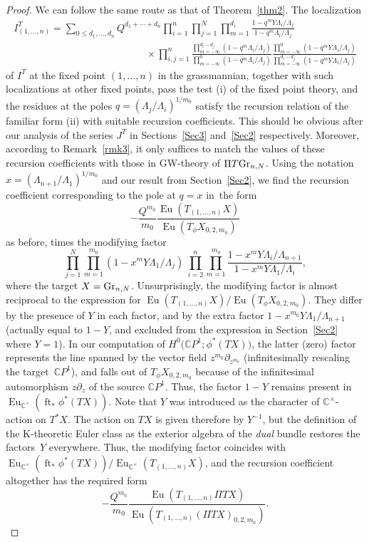 \documentclass[10pt,a4paper]{amsart}
\numberwithin{equation}{section}
\def\CC{\mathbb C}
\def\p{\partial}
\def\ft{\operatorname{ft}}
\def\Eu{\operatorname{Eu}}
\theoremstyle{definition}
\theoremstyle{plain}
\begin{document}
\begin{proof}
We can follow the same route as that of Theorem~\ref{thm2}. The localization
\begin{gather*}
I^T_{(1,\dots,n)}= \sum_{0\leq d_1,\dots,d_n}Q^{d_1+\cdots+d_n} \prod_{i=1}^n\prod_{j=1}^N\prod_{m=1}^{d_i}\frac{1-q^mY\Lambda_i/\Lambda_j} {1-q^m\Lambda_i/\Lambda_j} \\ \phantom{I^T_{(1,\dots,n)}= \sum_{0\leq d_1,\dots,d_n}Q^{d_1+\cdots}}
{}\times \prod_{i,j=1}^n\frac{\prod_{m=-\infty}^{d_i-d_j}(1-q^m\Lambda_i/\Lambda_j)} {\prod_{m=-\infty}^0(1-q^m\Lambda_i/\Lambda_j)}\frac{\prod_{m=-\infty}^0(1-q^mY \Lambda_i/\Lambda_j)} {\prod_{m=-\infty}^{d_i-d_j}(1-q^mY \Lambda_i/\Lambda_j)}
\end{gather*}
of $I^T$ at the fixed point $(1,\dots,n)$ in the grassmannian, together with such localizations at other fixed points, pass the test (i) of the fixed point theory, and the residues at the poles $q=(\Lambda_j/\Lambda_i)^{1/m_0}$ satisfy the recursion relation of the familiar form (ii) with suitable recursion coefficients. This should be obvious after our analysis of the series $J^T$ in Sections~\ref{Sec3} and~\ref{Sec2} respectively. Moreover, according to Remark~\ref{rmk3}, it only suffices to match the values of these recursion coefficients with those in GW-theory of $\Pi T {\rm Gr}_{n,N}$. Using the notation $x=(\Lambda_{n+1}/\Lambda_1)^{1/m_0}$ and our result from Section~\ref{Sec2}, we find the recursion coefficient corresponding to the pole at $q=x$ in~the form
\[
-\frac{Q^{m_0}}{m_0} \frac{\Eu(T_{(1,\dots,n)}X)}{\Eu(T_{\phi}X_{0,2,m_0})}
\]
as before, times the modifying factor
\[
\prod_{j=1}^N\prod_{m=1}^{m_0}(1-x^mY\Lambda_1/\Lambda_j)\ \prod_{i=2}^n\prod_{m=1}^{m_0} \frac{1-x^mY\Lambda_i/\Lambda_{n+1}}{1-x^mY\Lambda_1/\Lambda_i},
\]
where the target $X={\rm Gr}_{n,N}$. Unsurprisingly, the modifying factor is almost reciprocal to the expression for $\Eu(T_{(1,\dots,n)}X)/\Eu(T_{\phi}X_{0,2,m_0})$. They differ by the presence of $Y$ in each factor, and by the extra factor $1-x^{m_0}Y\Lambda_1/\Lambda_{n+1}$ (actually equal to $1-Y$, and excluded from the expression in Section~\ref{Sec2} where $Y=1$). In our computation of $H^0\big(\CC P^1;\phi^*(TX)\big)$, the latter (zero) factor represents the line spanned by the vector field $z^{m_0}\p_{z^{m_0}}$ (infinitesimally rescaling the target~$\CC P^1$), and falls out of $T_{\phi}X_{0,2,m_0}$ because of the infinitesimal automorphism $z\p_z$ of the source $\CC P^1$. Thus, the factor $1-Y$ remains present in $\Eu_{\CC^{\times}}(\ft_*\phi^*(TX))$. Note that $Y$ was introduced as the character of $\CC^{\times}$-action on $T^*X$. The action on $TX$ is given therefore by $Y^{-1}$, but the definition of the K-theoretic Euler class as the exterior algebra of the {\em dual} bundle restores the factors~$Y$ everywhere. Thus, the modifying factor coincides with $\Eu_{\CC^{\times}}(\ft_*\phi^*(TX))/\Eu_{\CC^{\times}}(T_{(1,\dots,n)}X)$, and the recursion coefficient altogether has the required form
\[
-\frac{Q^{m_0}}{m_0} \frac{\Eu(T_{(1,\dots,n)}\Pi TX)}{\Eu (T_{(1,\dots,n)}(\Pi TX)_{0,2,m_0})}.\tag*{\qed}
\]
\renewcommand{\qed}{}
\end{proof}
\end{document}
